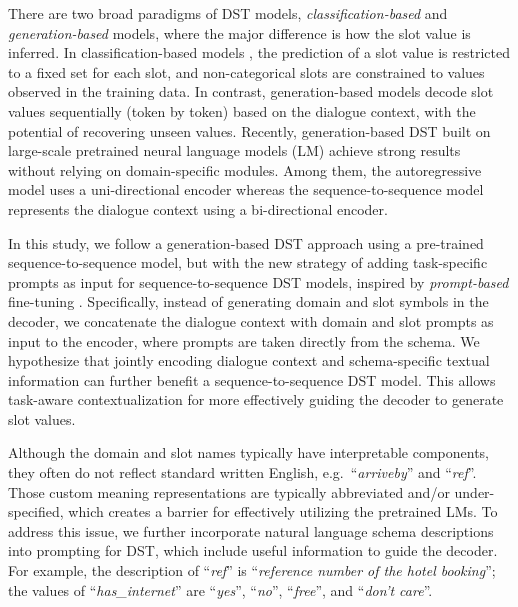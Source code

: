 \documentclass[11pt]{article}
\begin{document}
There are two broad paradigms of DST models, \textit{classification-based} and \textit{generation-based} models, where the major difference is how the slot value is inferred.
In classification-based models \cite{ye2021slot,chen2020schema}, the prediction of a slot value is restricted to a fixed set for each slot, and non-categorical slots are constrained to values observed in the training data.
In contrast, generation-based models \cite{wu2019transferable,kim2020efficient} decode slot values sequentially (token by token) based on the dialogue context, with the potential of recovering unseen values.
Recently, generation-based DST built on large-scale pretrained neural language models (LM) achieve strong results without relying on domain-specific modules.
Among them, the autoregressive model \cite{peng2020soloist,hosseini2020simple} uses a uni-directional encoder whereas the sequence-to-sequence model \cite{lin-etal-2020-mintl,heck2020trippy} represents the dialogue context using a bi-directional encoder.




In this study, we follow a generation-based DST approach using a pre-trained sequence-to-sequence model, but with the new strategy of adding task-specific prompts as input for sequence-to-sequence DST models, inspired by \textit{prompt-based} fine-tuning \cite{radford2019language,gpt3}.
Specifically, instead of generating domain and slot symbols in the decoder, 
we concatenate the dialogue context with domain and slot prompts as input to the encoder, where prompts are taken directly from the schema.
We hypothesize that jointly encoding dialogue context and schema-specific textual information can further benefit a sequence-to-sequence DST model.
This allows task-aware contextualization for more effectively guiding the decoder to generate slot values.


Although the domain and slot names typically have interpretable components, they often do not reflect standard written English, e.g.\ ``\textit{arriveby}'' and ``\textit{ref}''.
Those custom meaning representations are typically abbreviated and/or under-specified, which creates a barrier for effectively utilizing the pretrained LMs.
To address this issue, we further incorporate natural language schema descriptions into prompting for DST,
which include useful information to guide the decoder.
For example, the description of ``\textit{ref}'' is ``\textit{reference number of the hotel booking}'';
the values of ``\textit{has\_internet}'' are ``\textit{yes}'', ``\textit{no}'', ``\textit{free}'', and ``\textit{don't care}''.
\end{document}
